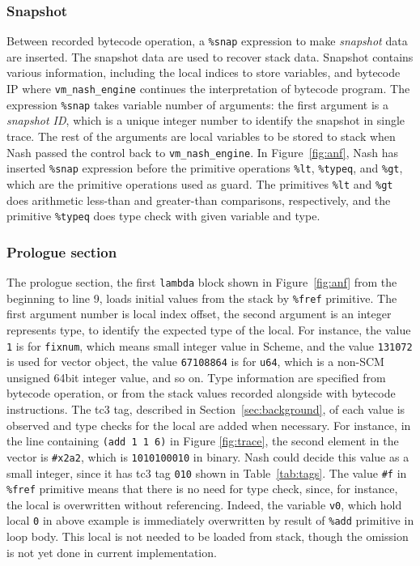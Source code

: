 \documentclass[preprint]{sigplanconf}
\begin{document}
\subsubsection{Snapshot}

Between recorded bytecode operation, a \texttt{\%snap} expression to make
\textit{snapshot} data are inserted. The snapshot data are used to recover stack
data. Snapshot contains various information, including the local indices to
store variables, and bytecode IP where \texttt{vm\_nash\_engine} continues the
interpretation of bytecode program. The expression \texttt{\%snap} takes
variable number of arguments: the first argument is a \textit{snapshot ID},
which is a unique integer number to identify the snapshot in single trace. The
rest of the arguments are local variables to be stored to stack when Nash passed
the control back to \texttt{vm\_nash\_engine}. In
Figure~\hyperref[fig:anf]{\ref{fig:anf}}, Nash has inserted \texttt{\%snap}
expression before the primitive operations \texttt{\%lt}, \texttt{\%typeq}, and
\texttt{\%gt}, which are the primitive operations used as guard. The primitives
\texttt{\%lt} and \texttt{\%gt} does arithmetic less-than and greater-than
comparisons, respectively, and the primitive \texttt{\%typeq} does type check
with given variable and type.

\subsubsection{Prologue section}

The prologue section, the first \texttt{lambda} block shown in
Figure~\hyperref[fig:anf]{\ref{fig:anf}} from the beginning to line 9, loads
initial values from the stack by \texttt{\%fref} primitive. The first argument
number is local index offset, the second argument is an integer represents
type, to identify the expected type of the local. For instance, the value
\texttt{1} is for \texttt{fixnum}, which means small integer value in Scheme,
and the value \texttt{131072} is used for vector object, the value
\texttt{67108864} is for \texttt{u64}, which is a non-SCM unsigned 64bit
integer value, and so on. Type information are specified from bytecode
operation, or from the stack values recorded alongside with bytecode
instructions. The tc3 tag, described in Section~\ref{sec:background}, of each
value is observed and type checks for the local are added when necessary. For
instance, in the line containing \texttt{(add 1 1 6)} in Figure
\hyperref[fig:trace]{\ref{fig:trace}}, the second element in the vector is
\texttt{\#x2a2}, which is \texttt{1010100010} in binary. Nash could decide
this value as a small integer, since it has tc3 tag \texttt{010} shown in
Table~\hyperref[tab:tags]{\ref{tab:tags}}. The value \texttt{\#f} in
\texttt{\%fref} primitive means that there is no need for type check, since,
for instance, the local is overwritten without referencing. Indeed, the
variable \texttt{v0}, which hold local \texttt{0} in above example is
immediately overwritten by result of \texttt{\%add} primitive in loop
body. This local is not needed to be loaded from stack, though the omission is
not yet done in current implementation.
\end{document}
